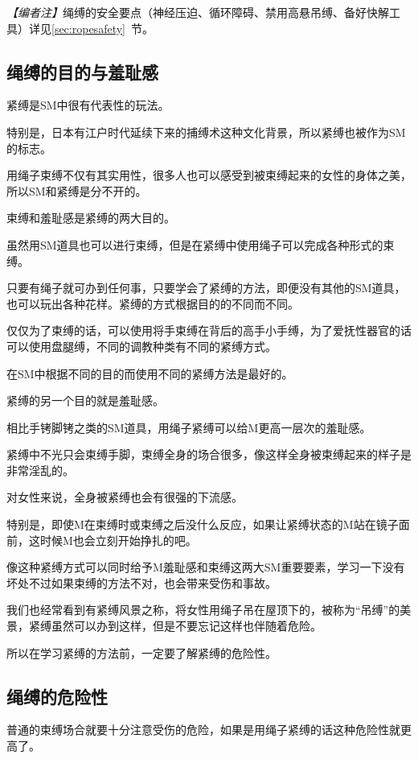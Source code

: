 \documentclass[12pt,UTF8]{ctexbook}
\begin{document}
\noindent\textit{【编者注】}绳缚的安全要点（神经压迫、循环障碍、禁用高悬吊缚、备好快解工具）详见\ref{sec:ropesafety}~节。

\subsection{绳缚的目的与羞耻感}

紧缚是SM中很有代表性的玩法。

特别是，日本有江户时代延续下来的捕缚术这种文化背景，所以紧缚也被作为SM的标志。

用绳子束缚不仅有其实用性，很多人也可以感受到被束缚起来的女性的身体之美，所以SM和紧缚是分不开的。

束缚和羞耻感是紧缚的两大目的。

虽然用SM道具也可以进行束缚，但是在紧缚中使用绳子可以完成各种形式的束缚。

只要有绳子就可办到任何事，只要学会了紧缚的方法，即便没有其他的SM道具，也可以玩出各种花样。紧缚的方式根据目的的不同而不同。

仅仅为了束缚的话，可以使用将手束缚在背后的高手小手缚，为了爱抚性器官的话可以使用盘腿缚，不同的调教种类有不同的紧缚方式。

在SM中根据不同的目的而使用不同的紧缚方法是最好的。

紧缚的另一个目的就是羞耻感。

相比手铐脚铐之类的SM道具，用绳子紧缚可以给M更高一层次的羞耻感。

紧缚中不光只会束缚手脚，束缚全身的场合很多，像这样全身被束缚起来的样子是非常淫乱的。

对女性来说，全身被紧缚也会有很强的下流感。

特别是，即使M在束缚时或束缚之后没什么反应，如果让紧缚状态的M站在镜子面前，这时候M也会立刻开始挣扎的吧。

像这种紧缚方式可以同时给予M羞耻感和束缚这两大SM重要要素，学习一下没有坏处不过如果束缚的方法不对，也会带来受伤和事故。

我们也经常看到有紧缚风景之称，将女性用绳子吊在屋顶下的，被称为“吊缚”的美景，紧缚虽然可以办到这样，但是不要忘记这样也伴随着危险。

所以在学习紧缚的方法前，一定要了解紧缚的危险性。

\subsection{绳缚的危险性}

普通的束缚场合就要十分注意受伤的危险，如果是用绳子紧缚的话这种危险性就更高了。
\end{document}

